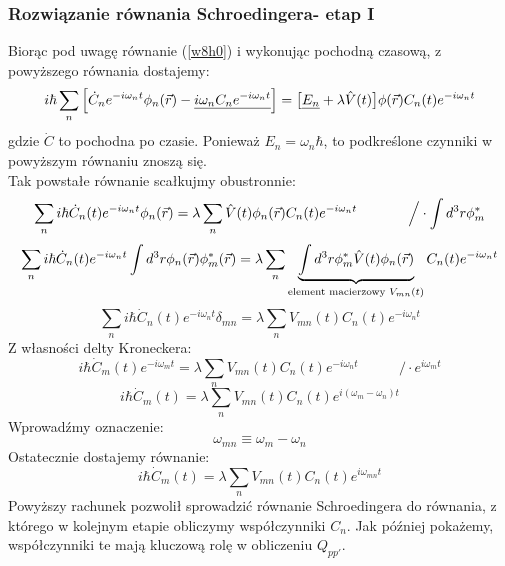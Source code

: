 \subsubsection{Rozwiązanie równania Schroedingera- etap I}
Biorąc pod uwagę równanie (\ref{w8h0}) i wykonując pochodną czasową, z powyższego równania dostajemy:
\begin{equation}i\hbar\sum_n\Big[ \dot{C}_n e^{-i\omega_nt}\phi_n(\vec{r})
-\underline{i\omega_nC_ne^{-i\omega_nt}} \Big]=
\big[\underline{E_n}+\lambda\hat{V}(t)\big]\phi(\vec{r})C_n(t)e^{-i\omega_nt}
\end{equation}
gdzie $\dot{C}$ to pochodna po czasie. Ponieważ $E_n=\omega_n\hbar$, to podkreślone czynniki w powyższym równaniu znoszą się.\\
Tak powstałe równanie scałkujmy obustronnie:
\begin{equation}\sum_n i\hbar \dot{C}_n(t)e^{-i\omega_nt}\phi_n(\vec{r})=\lambda\sum_n \hat{V}(t)\phi_n(\vec{r})C_n(t)e^{-i\omega_nt}~~~~~~~~~~~\Big/\cdot\int d^3r\phi_m^*\nonumber\end{equation}
\begin{equation}\sum_n i\hbar\dot{C}_n(t)e^{-i\omega_nt}\int d^3r \phi_n(\vec{r})\phi_m^*(\vec{r})=
\lambda\sum_n\underbrace{\int d^3r\phi_m^* \hat{V}(t)\phi_n(\vec{r})}_{\text{element macierzowy~} V_{mn}(t)}C_n(t)e^{-i\omega_nt}
\end{equation}
\begin{equation}\sum_n i\hbar\dot{C}_n(t)e^{-i\omega_nt}\delta_{mn}=
\lambda\sum_n V_{mn}(t)C_n(t)e^{-i\omega_nt}
\end{equation}
Z własności delty Kroneckera:
\begin{equation} i\hbar\dot{C}_m(t)e^{-i\omega_mt}=
\lambda\sum_n V_{mn}(t)C_n(t)e^{-i\omega_nt}~~~~~~~~~~~~~\Big/\cdot e^{i\omega_mt}
\nonumber\end{equation}
\begin{equation} i\hbar\dot{C}_m(t)=
\lambda\sum_n V_{mn}(t)C_n(t)e^{i(\omega_m-\omega_n)t}
\end{equation}
Wprowadźmy oznaczenie:
\begin{equation}\omega_{mn}\equiv \omega_m - \omega_n
\end{equation}
Ostatecznie dostajemy równanie:
\begin{equation} i\hbar\dot{C}_m(t)=
\lambda\sum_n V_{mn}(t)C_n(t)e^{i\omega_{mn}t}
\end{equation}
Powyższy rachunek pozwolił sprowadzić równanie Schroedingera do równania, z którego w kolejnym etapie obliczymy współczynniki $C_n$. Jak później pokażemy, współczynniki te mają kluczową rolę w obliczeniu $Q_{pp'}$.

